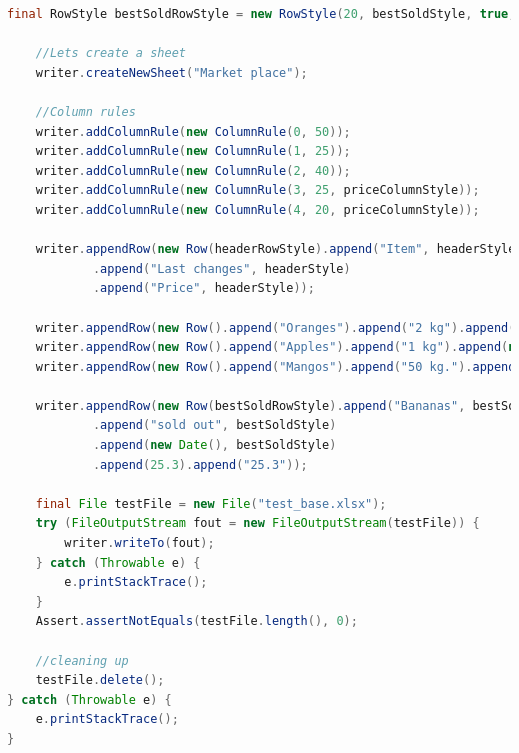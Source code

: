 \documentclass[14pt]{matmex-diploma}
\begin{document}
\begin{lstlisting}[language=Java, style=basic, caption={Пример создания документа XLSX с форматированием с помощью библиотеки oxml-doc}, captionpos=b, label=java2]
    final RowStyle bestSoldRowStyle = new RowStyle(20, bestSoldStyle, true, true);
    
    //Lets create a sheet
    writer.createNewSheet("Market place");
    
    //Column rules
    writer.addColumnRule(new ColumnRule(0, 50));
    writer.addColumnRule(new ColumnRule(1, 25));
    writer.addColumnRule(new ColumnRule(2, 40));
    writer.addColumnRule(new ColumnRule(3, 25, priceColumnStyle));
    writer.addColumnRule(new ColumnRule(4, 20, priceColumnStyle));
    
    writer.appendRow(new Row(headerRowStyle).append("Item", headerStyle).append("Count", headerStyle)
            .append("Last changes", headerStyle)
            .append("Price", headerStyle));

    writer.appendRow(new Row().append("Oranges").append("2 kg").append(new Date()).append(10).append("10.0"));
    writer.appendRow(new Row().append("Apples").append("1 kg").append(new Date()).append(20).append("20.0"));
    writer.appendRow(new Row().append("Mangos").append("50 kg.").append(new Date()).append(30).append("30.0"));

    writer.appendRow(new Row(bestSoldRowStyle).append("Bananas", bestSoldStyle)
            .append("sold out", bestSoldStyle)
            .append(new Date(), bestSoldStyle)
            .append(25.3).append("25.3"));

    final File testFile = new File("test_base.xlsx");
    try (FileOutputStream fout = new FileOutputStream(testFile)) {
        writer.writeTo(fout);
    } catch (Throwable e) {
        e.printStackTrace();
    }
    Assert.assertNotEquals(testFile.length(), 0);

    //cleaning up
    testFile.delete();
} catch (Throwable e) {
    e.printStackTrace();
}
\end{lstlisting}
\setmonofont[Mapping=tex-text]{CMU Typewriter Text}


\end{document}

